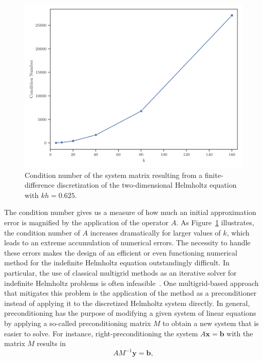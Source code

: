 \begin{figure}
		\includegraphics[scale=0.655]{figures/cond.pdf}
		\caption[Condition number resulting from a finite-difference discretization of the two-dimensional Helmholtz equation]{Condition number of the system matrix resulting from a finite-difference discretization of the two-dimensional Helmholtz equation with $kh = 0.625$.}
		\label{fig:condition-number-helmholtz}
\end{figure}
The condition number gives us a measure of how much an initial approximation error is magnified by the application of the operator $A$.
As Figure~\ref{fig:condition-number-helmholtz} illustrates, the condition number of $A$ increases dramatically for larger values of $k$, which leads to an extreme accumulation of numerical errors. 
The necessity to handle these errors makes the design of an efficient or even functioning numerical method for the indefinite Helmholtz equation outstandingly difficult.
In particular, the use of classical multigrid methods as an iterative solver for indefinite Helmholtz problems is often infeasible~\cite{ernst2012difficult}.
One multigrid-based approach that mitigates this problem is the application of the method as a preconditioner instead of applying it to the discretized Helmholtz system directly.
In general, preconditioning has the purpose of modifying a given system of linear equations by applying a so-called preconditioning matrix $M$ to obtain a new system that is easier to solve.
For instance, right-preconditioning the system $A \bm{x} = \bm{b}$ with the matrix $M$ results in
\begin{equation}
	A M^{-1} \bm{y} = \bm{b},
	\label{eq:right-preconditioning}
\end{equation}
